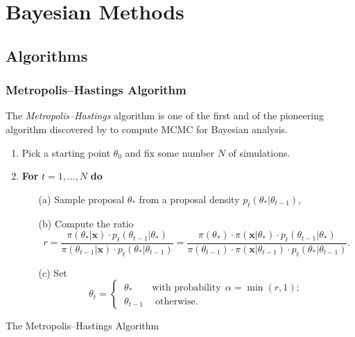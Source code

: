 \documentclass[11pt,a4paper,openany ]{book}
\begin{document}
\chapter{Bayesian Methods}\label{appB}

\section{Algorithms}

\subsection{Metropolis–Hastings Algorithm}

The \emph{Metropolis–Hastings} algorithm is one of the first and of the pioneering algorithm discovered by \cite{hastings_monte_1970} to compute  MCMC for Bayesian analysis.

\begin{algorithm}[H]
	\SetAlgoLined
	\begin{enumerate}
		\item Pick a starting point $\theta_0$ and fix some number $N$ of simulations.
		\item \textbf{For} $t=1,\dots,N$ \quad \textbf{do}
		\begin{itemize}
			\item[(a)] Sample proposal $\theta_*$ from a proposal density $p_t(\theta_*|\theta_{t-1})$,
			\item[(b)] Compute the ratio
			\begin{equation*}
			r = \frac{\pi(\theta_*|\boldsymbol{x})\cdot p_t(\theta_{t-1}|\theta_*)}{\pi(\theta_{t-1}|\boldsymbol{x})\cdot p_t(\theta_*|\theta_{t-1})} = \frac{\pi(\theta_*)\cdot \pi(\boldsymbol{x}|\theta_*)\cdot p_t(\theta_{t-1}|\theta_*)}{\pi(\theta_{t-1})\cdot \pi(\boldsymbol{x}|\theta_{t-1})\cdot p_t(\theta_*|\theta_{t-1})}.
			\end{equation*}
			\item[(c)] Set 
			\begin{equation*}
			\theta_t= 			\begin{cases} \ \theta_* \qquad \text{with probability} \ \  \alpha=\min (r,1); \\
			\ \theta_{t-1} \ \quad \text{otherwise}.
			\end{cases}
			\end{equation*}
		\end{itemize}
	\end{enumerate}
	\caption{The Metropolis–Hastings Algorithm}
\end{algorithm}
\end{document}
